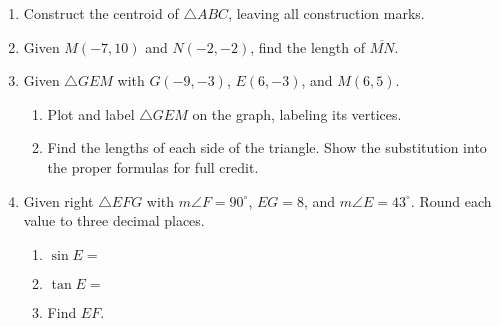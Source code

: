 \begin{enumerate}
\newpage
\item Construct the centroid of $\triangle ABC$, leaving all construction marks.
\vspace{5cm}
\begin{center}
\end{center} \vspace{1.5cm}

\newpage
\item Given $M(-7,10)$ and $N(-2,-2)$, find the length of $\overline{MN}$.
    \vspace{5cm}

\item Given $\triangle GEM$ with $G(-9, -3)$, $E(6, -3)$, and $M(6, 5)$.
  \begin{enumerate}
    \item Plot and label $\triangle GEM$ on the graph, labeling its vertices.
    \item Find the lengths of each side of the triangle. Show the substitution into the proper formulas for full credit.
  \end{enumerate}
  \vspace{3cm}

\newpage
\item Given right $\triangle EFG$ with $m\angle F=90^\circ$, $EG=8$, and $m\angle E=43^\circ$. Round each value to three decimal places.  \vspace{0.5cm}
  \begin{multicols}{2}
  \begin{enumerate}
    \item $\sin E=$ \vspace{0.8cm}
    \item $\tan E=$ \vspace{0.8cm}
    \item Find $EF$.
  \end{enumerate}
  \begin{center}
      \vspace{2cm}
  \end{center}
  \end{multicols}
  \vspace{3cm}


\end{enumerate}
